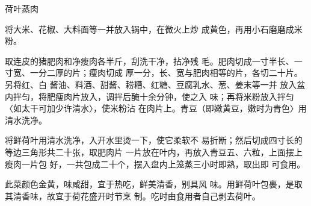 \begin{recipe}{荷叶蒸肉}

\ingredients


\cooking

\step 	将大米、花椒、大料面等一并放入锅中，在微火上炒 成黄色，再用小石磨磨成米粉。

\step 	取连皮的猪肥肉和净瘦肉各半斤，刮洗干净，拈净残 毛。肥肉切成一寸半长、一寸宽、一分二厚的片；痩肉切成 厚一分，长、宽与肥肉相等的片，各切二十片。另将红、白 酱油、料酒、甜酱、耢糟、红糖、豆腐乳水、葱、姜末等一并 放入盆内拌匀，将肥瘦肉片放入，调拌后醃十余分钟，使之入 味；再将米粉放入拌匀〈如太干可加少许清水〉，使米粉沾 在肉片上。青豆（即嫩黄豆，嫩时为青色〉用清水洗净。

\step 	将鲜荷叶用清水洗净，入开水里烫一下，使它柔软不 易折断；然后切成四寸长的等边三角形共二十张，取肥肉片 一片放在叶内，再放入青豆五、六粒，上面摆上瘦肉一片包 好，一共包成二十个，摆入盘内上笼蒸三小时即熟，取出即 可食用。

\notes

此菜颜色金黄，味咸甜，宜于热吃，鲜美清香，别具风 味。用鲜荷叶包裹，是取其清香味，故宜于荷花盛开时节烹 制。吃时由食用者自己剥去荷叶。

\end{recipe}

